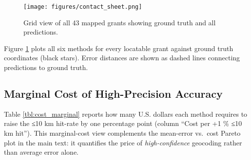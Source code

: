 \begin{figure}
\centering
\texttt{[image: figures/contact\_sheet.png]}
\caption{Grid view of all 43 mapped grants showing ground truth and all
predictions.}\label{fig:contactsheet}
\end{figure}

Figure \ref{fig:contactsheet} plots all six methods for every locatable
grant against ground truth coordinates (black stars). Error distances
are shown as dashed lines connecting predictions to ground truth.

\subsection{Marginal Cost of High-Precision
Accuracy}\label{c.3-marginal-cost-of-high-precision-accuracy}

Table \ref{tbl:cost_marginal} reports how many U.S. dollars each method
requires to raise the ≤10 km hit-rate by one percentage point (column
``Cost per +1 \% ≤10 km hit''). This marginal-cost view complements the
mean-error vs.~cost Pareto plot in the main text: it quantifies the
price of \emph{high-confidence} geocoding rather than average error
alone.

